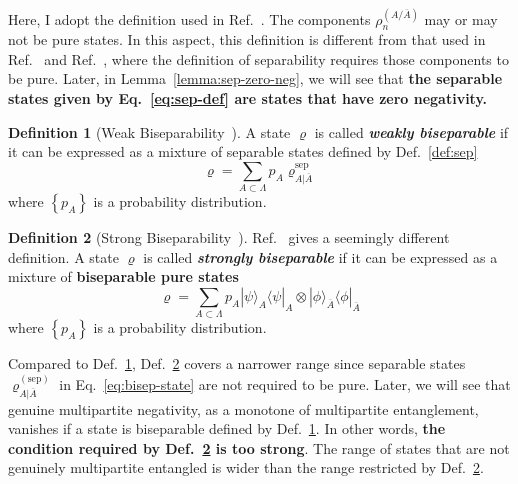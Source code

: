 \documentclass[12font]{article}
\theoremstyle{definition}
\newtheorem{definition}{Definition}[section]
\newcommand{\bra}[1]{\langle #1 |}
\newcommand{\ket}[1]{| #1 \rangle}
\newcommand{\lrg}[1]{\left\{  #1  \right\}}
\newcommand{\mrm}[1]{\mathrm{#1}}
\begin{document}
Here, I adopt the definition used in Ref.~\cite{Guhne-Toth_2009}. The components $\rho^{(A/\overline{A})}_n$ may or may not be pure states. In this aspect, this definition is different from that used in Ref.~\cite{Jungnitsch-Moroder-Guhne_2011} and Ref.~\cite{Lyu-Chandorkar-Kapoor-Takei-Sorensen-Witczak-Krempa_2026}, where the definition of separability requires those components to be pure. Later, in Lemma~\ref{lemma:sep-zero-neg}, we will see that \textbf{the separable states given by Eq.~\eqref{eq:sep-def} are states that have zero negativity.}

\begin{definition}[Weak Biseparability~\cite{Jungnitsch-Moroder-Guhne_2011}]\label{def:bisep}
    A state $\varrho$ is called \textbf{\textit{weakly biseparable}} if it can be expressed as a mixture of separable states defined by Def.~\ref{def:sep}
    \begin{equation}\label{eq:bisep-state}
        \varrho = \sum_{A \subset \Lambda}p_{A} \varrho^{\mrm{sep}}_{A|\overline{A}}
    \end{equation}
    where $\lrg{p_A}$ is a probability distribution.
\end{definition}

\begin{definition}[Strong Biseparability~\cite{Lyu-Chandorkar-Kapoor-Takei-Sorensen-Witczak-Krempa_2026}]\label{def:bisep-2}
    Ref.~\cite{Lyu-Chandorkar-Kapoor-Takei-Sorensen-Witczak-Krempa_2026} gives a seemingly different definition. A state $\varrho$ is called \textbf{\textit{strongly biseparable}} if it can be expressed as a mixture of \textbf{biseparable pure states}
    \begin{equation}\label{eq:bisep-state-2}
        \varrho = \sum_{A \subset \Lambda}p_{A} \ket{\psi}_A\bra{\psi}_A \otimes\ket{\phi}_{\overline{A}}\bra{\phi}_{\overline{A}}
    \end{equation}
    where $\lrg{p_A}$ is a probability distribution.
\end{definition}

Compared to Def.~\ref{def:bisep}, Def.~\ref{def:bisep-2} covers a narrower range since separable states $\varrho^{(\mrm{sep})}_{A|\overline{A}}$ in Eq.~\eqref{eq:bisep-state} are not required to be pure. Later, we will see that genuine multipartite negativity, as a monotone of multipartite entanglement, vanishes if a state is biseparable defined by Def.~\ref{def:bisep}. In other words, \textbf{the condition required by Def.~\ref{def:bisep-2} is too strong}. The range of states that are not genuinely multipartite entangled is wider than the range restricted by Def.~\ref{def:bisep-2}. 
\end{document}
